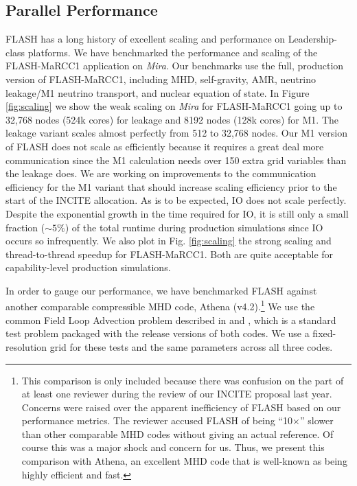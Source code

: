 

\subsection{Parallel Performance}
\label{sec:performance}


FLASH has a long history of excellent scaling and performance on Leadership-class platforms. 
We have benchmarked the performance and scaling of the FLASH-MaRCC1 application on {\it Mira}. 
Our benchmarks use the full, production version of FLASH-MaRCC1, including MHD, self-gravity, AMR, neutrino leakage/M1 neutrino transport, and nuclear equation of state. 
In Figure \ref{fig:scaling} we show the weak scaling on {\it Mira} for FLASH-MaRCC1 going up to 32,768 nodes (524k cores) for leakage and 8192 nodes (128k cores) for M1. 
The leakage variant scales almost perfectly from 512 to 32,768 nodes.  
Our M1 version of FLASH does not scale as efficiently because it requires a great deal more communication since the M1 calculation needs over 150 extra grid variables than the leakage does.
We are working on improvements to the communication efficiency for the M1 variant that should increase scaling efficiency prior to the start of the INCITE allocation.
As is to be expected, IO does not scale perfectly.
Despite the exponential growth in the time required for IO, it is still only a small fraction ($\sim5\%$) of the total runtime during production simulations since IO occurs so infrequently.  
We also plot in Fig. \ref{fig:scaling} the strong scaling and thread-to-thread speedup for FLASH-MaRCC1.  
Both are quite acceptable for capability-level production simulations.


In order to gauge our performance, we have benchmarked FLASH against another comparable compressible MHD code, Athena (v4.2).\footnote{This comparison is only included because there was confusion on the part of at least one reviewer during the review of our INCITE proposal last year.
Concerns were raised over the apparent inefficiency of FLASH based on our performance metrics.  
The reviewer accused FLASH of being ``10$\times$'' slower than other comparable MHD codes without giving an actual reference.
Of course this was a major shock and concern for us.
Thus, we present this comparison with Athena, an excellent MHD code that is well-known as being highly efficient and fast.
}  
We use the common Field Loop Advection problem described in \citet{Gardiner:2008dh} and \citet{Lee:2009kq}, which is a standard test problem packaged with the release versions of both codes.  We use a fixed-resolution grid for these tests and the same parameters across all three codes.  

